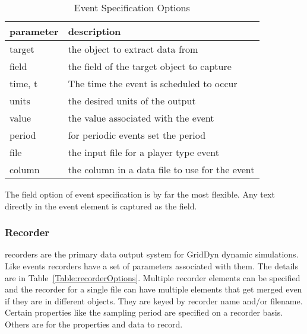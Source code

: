 \documentclass[12pt]{article} %
\begin{document}
  \begin{table}[ht]

      \caption{Event Specification Options} %
      \centering %
      \begin{tabular}{l p{14cm}} %
          \hline %
          parameter &  description \\ [0.5ex] %
          \hline %


          target  &  the object to extract data from\\
          field &  the field of the target object to capture \\
          time, t & The time the event is scheduled to occur \\
          units  & the desired units of the output \\%
        value & the value associated with the event \\
          period  &  for periodic events set the period\\
              file &  the input file for a player type event\\ %
              column & the column in a data file to use for the event \\
          \hline %
      \end{tabular}
      \label{Table:eventOptions}
  \end{table}

 The field option of event specification is by far the most flexible.  Any text directly in the event element is captured as the field.
 \subsubsection{Recorder}
 recorders are the primary data output system for GridDyn dynamic simulations.  Like events recorders have a set of parameters associated with them.  The details are in Table~\ref{Table:recorderOptions}.  Multiple recorder elements can be specified and the recorder for a single file can have multiple elements that get merged even if they are in different objects.  They are keyed by recorder name and/or filename.  Certain properties like the sampling period are specified on a recorder basis.  Others are for the properties and data to record.
\end{document}
